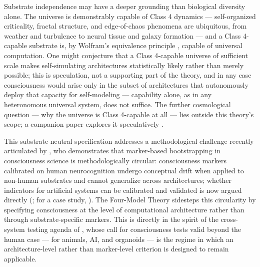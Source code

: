 \documentclass[12pt]{article}
\begin{document}
Substrate independence may have a deeper grounding than biological diversity alone. The universe is demonstrably capable of Class 4 dynamics --- self-organized criticality, fractal structure, and edge-of-chaos phenomena are ubiquitous, from weather and turbulence to neural tissue and galaxy formation --- and a Class 4-capable substrate is, by Wolfram's equivalence principle \citep{Wolfram2002}, capable of universal computation. One might conjecture that a Class 4-capable universe of sufficient scale makes self-simulating architectures statistically likely rather than merely possible; this is speculation, not a supporting part of the theory, and in any case consciousness would arise only in the subset of architectures that autonomously deploy that capacity for self-modeling --- capability alone, as in any heteronomous universal system, does not suffice. The further cosmological question --- why the universe is Class 4-capable at all --- lies outside this theory's scope; a companion paper explores it speculatively \citep{Gruber2026c}.

This substrate-neutral specification addresses a methodological challenge recently articulated by \citet{Beni2026}, who demonstrates that marker-based bootstrapping in consciousness science is methodologically circular: consciousness markers calibrated on human neurocognition undergo conceptual drift when applied to non-human substrates and cannot generalize across architectures; whether indicators for artificial systems can be calibrated and validated is now argued directly (\citealp{Koch2026,Pennartz2026,Butlin2026,vanRooyen2026}; for a case study, \citealp{Solms2026}). The Four-Model Theory sidesteps this circularity by specifying consciousness at the level of computational architecture rather than through substrate-specific markers. This is directly in the spirit of the cross-system testing agenda of \citet{Bayne2024}, whose call for consciousness tests valid beyond the human case --- for animals, AI, and organoids --- is the regime in which an architecture-level rather than marker-level criterion is designed to remain applicable.
\end{document}

